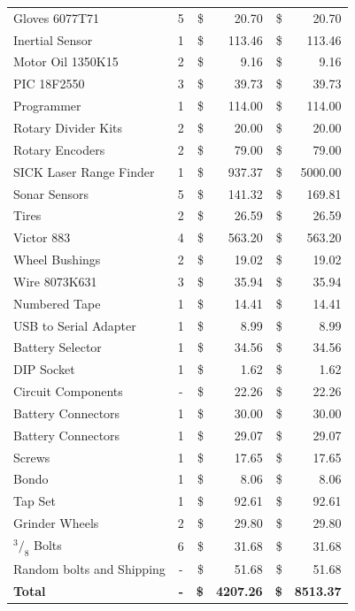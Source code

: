 \documentclass[12pt]{article}%
\begin{document}
\begin{longtable}[p]{l||c|rr|rr}
        Gloves 6077T71               & 5 & \$ &   20.70 & \$ &   20.70\\%
        Inertial Sensor              & 1 & \$ &  113.46 & \$ &  113.46\\
        Motor Oil 1350K15            & 2 & \$ &    9.16 & \$ &    9.16\\
        PIC 18F2550                  & 3 & \$ &   39.73 & \$ &   39.73\\
        Programmer                   & 1 & \$ &  114.00 & \$ &  114.00\\%
        Rotary Divider Kits          & 2 & \$ &   20.00 & \$ &   20.00\\
        Rotary Encoders              & 2 & \$ &   79.00 & \$ &   79.00\\
        SICK Laser Range Finder      & 1 & \$ &  937.37 & \$ & 5000.00\\
        Sonar Sensors                & 5 & \$ &  141.32 & \$ &  169.81\\
        Tires                        & 2 & \$ &   26.59 & \$ &   26.59\\%
        Victor 883                   & 4 & \$ &  563.20 & \$ &  563.20\\
        Wheel Bushings               & 2 & \$ &   19.02 & \$ &   19.02\\
        Wire 8073K631                & 3 & \$ &   35.94 & \$ &   35.94\\
        Numbered Tape                & 1 & \$ &   14.41 & \$ &   14.41\\
        USB to Serial Adapter        & 1 & \$ &    8.99 & \$ &    8.99\\
        Battery Selector             & 1 & \$ &   34.56 & \$ &   34.56\\
        DIP Socket                   & 1 & \$ &    1.62 & \$ &    1.62\\
        Circuit Components           & - & \$ &   22.26 & \$ &   22.26\\
        Battery Connectors           & 1 & \$ &   30.00 & \$ &   30.00\\%
        Battery Connectors           & 1 & \$ &   29.07 & \$ &   29.07\\%
        Screws                       & 1 & \$ &   17.65 & \$ &   17.65\\%
        Bondo                        & 1 & \$ &    8.06 & \$ &    8.06\\
        Tap Set                      & 1 & \$ &   92.61 & \$ &   92.61\\
        Grinder Wheels               & 2 & \$ &   29.80 & \$ &   29.80\\
        $^3/_8$ Bolts                & 6 & \$ &   31.68 & \$ &   31.68\\
        Random bolts and Shipping    & - & \$ &   51.68 & \$ &   51.68\\%
        \midrule
        \textbf{Total} & \textbf{-} & \textbf{\$} & \textbf{4207.26} & \textbf{\$} & \textbf{8513.37}\\
        \bottomrule
    \end{longtable}
\end{document}
